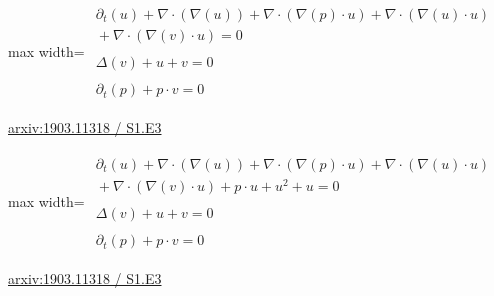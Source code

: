 \documentclass[10pt,a4paper]{article}
\begin{document}
\begin{minipage}{\linewidth}
\begin{center}\begin{adjustbox}{max width=\linewidth}$\displaystyle\begin{gathered}\begin{gathered}\partial_{t}(u)+\nabla\cdot(\nabla(u))+\nabla\cdot(\nabla(p)\cdot u)+\nabla\cdot(\nabla(u)\cdot u)\\[-1pt]{}+\nabla\cdot(\nabla(v)\cdot u)=0\end{gathered}\\[5pt]\begin{gathered}\Delta(v)+u+v=0\end{gathered}\\[5pt]\begin{gathered}\partial_{t}(p)+p\cdot v=0\end{gathered}\end{gathered}$\end{adjustbox}\end{center}
{\small \href{https://arxiv.org/html/1903.11318#S1.E3}{arxiv:1903.11318 / S1.E3}}\par
\end{minipage}\par\vspace{7mm}

\begin{minipage}{\linewidth}
\begin{center}\begin{adjustbox}{max width=\linewidth}$\displaystyle\begin{gathered}\begin{gathered}\partial_{t}(u)+\nabla\cdot(\nabla(u))+\nabla\cdot(\nabla(p)\cdot u)+\nabla\cdot(\nabla(u)\cdot u)\\[-1pt]{}+\nabla\cdot(\nabla(v)\cdot u)+p\cdot u+u^{2}+u=0\end{gathered}\\[5pt]\begin{gathered}\Delta(v)+u+v=0\end{gathered}\\[5pt]\begin{gathered}\partial_{t}(p)+p\cdot v=0\end{gathered}\end{gathered}$\end{adjustbox}\end{center}
{\small \href{https://arxiv.org/html/1903.11318#S1.E3}{arxiv:1903.11318 / S1.E3}}\par
\end{minipage}\par\vspace{7mm}
\end{document}
